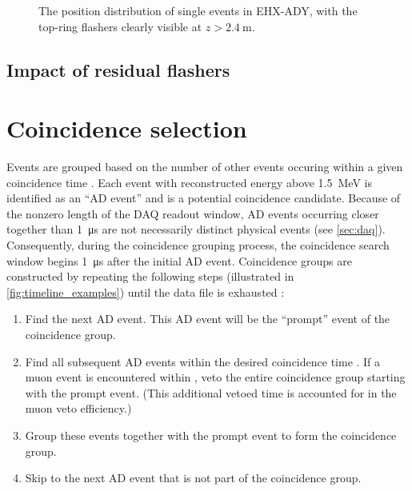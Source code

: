\begin{figure}
    \caption{
        The position distribution of single events in EHX-ADY,
        with the top-ring flashers clearly visible at $z > \SI{2.4}{\m}$.
    }
    \label{fig:flash_top_ring}
\end{figure}


\subsection{Impact of residual flashers}
\label{subsec:flash_resid_study}

\section{Coincidence selection}
\label{sec:coincidence}

Events are grouped based on the number of other events
occuring within a given coincidence time \tc.
Each event with reconstructed energy above \SI{1.5}{\mega\electronvolt}
is identified as an ``AD event''
and is a potential coincidence candidate.
Because of the nonzero length of the DAQ readout window,
AD events occurring closer together than \SI{1}{\micro\second}
are not necessarily distinct physical events (see \cref{sec:daq}).
Consequently, during the coincidence grouping process,
the coincidence search window begins \SI{1}{\micro\second}
after the initial AD event.
Coincidence groups are constructed by repeating the following steps
(illustrated in \cref{fig:timeline_examples}) until the data file is exhausted \cite{thucoinc2015}:

\begin{enumerate}
    \item Find the next AD event.
        This AD event will be the ``prompt'' event of the coincidence group.
    \item Find all subsequent AD events within the desired coincidence time \tc.
        If a muon event is encountered within \tc,
        veto the entire coincidence group starting with the prompt event.
        (This additional vetoed time is accounted for in the muon veto efficiency.)
    \item Group these events together with the prompt event
        to form the coincidence group.
    \item Skip to the next AD event that is not part of the coincidence group.
\end{enumerate}

